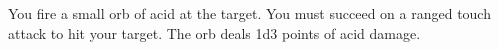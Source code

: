 \spelldatastart
{}
\spellrange{\closerange}
\spelldataend

You fire a small orb of acid at the target. You must succeed on a ranged touch attack to hit your target. The orb deals 1d3 points of acid damage.
\newline
\newline
\newline
\newline
\newline
\spellfoot